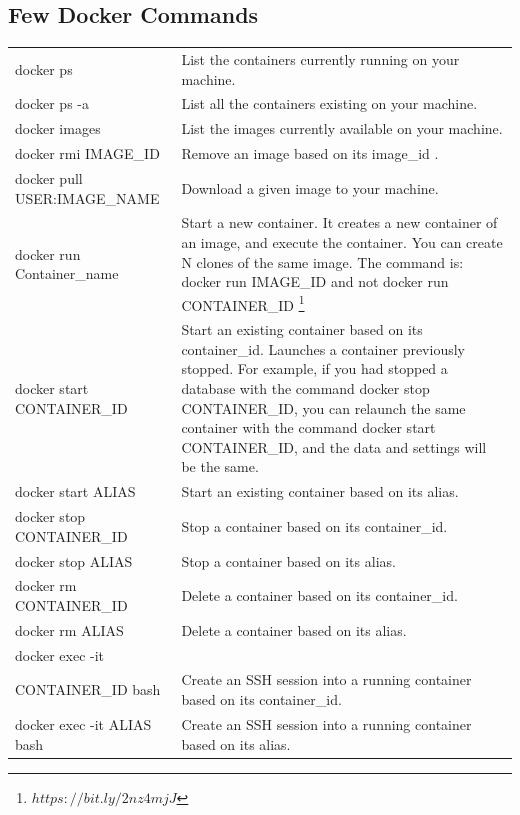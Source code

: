 \documentclass[a4paper]{article}
\begin{document}
\subsection{Few Docker Commands}
\begin{tabular} { >{\ttfamily}l  p{6.5cm} }
docker ps 						&	List the containers currently running on your machine.\\
docker ps -a 					&	List all the containers existing on your machine.\\
docker images 					&	List the images currently available on your machine.\\
docker rmi IMAGE\_ID 			&	Remove an image based on its image\_id .\\
docker pull USER:IMAGE\_NAME 	&	Download a given image to your machine.\\
docker run Container\_name 				&	Start a new container. It creates a new container of an image, and execute the container. You can create N clones of the same image. The command is: docker run IMAGE\_ID and not docker run CONTAINER\_ID \footnote{$https://bit.ly/2nz4mjJ$}\\
docker start CONTAINER\_ID 		&	Start an existing container based on its container\_id. Launches a container previously stopped. For example, if you had stopped a database with the command docker stop CONTAINER\_ID, you can relaunch the same container with the command docker start CONTAINER\_ID, and the data and settings will be the same.\\
docker start ALIAS  			&	Start an existing container based on its alias.\\
docker stop CONTAINER\_ID  		&	Stop a container based on its container\_id.\\
docker stop ALIAS 				&	Stop a container based on its alias.\\
docker rm CONTAINER\_ID 			&	Delete a container based on its container\_id. \\
docker rm ALIAS 				&	Delete a container based on its alias. \\
docker exec -it \\ CONTAINER\_ID bash&  Create an SSH session into a running container based on its container\_id. \\
docker exec -it ALIAS bash 		&	Create an SSH session into a running container based on its alias. \\
\end{tabular}
\end{document}

